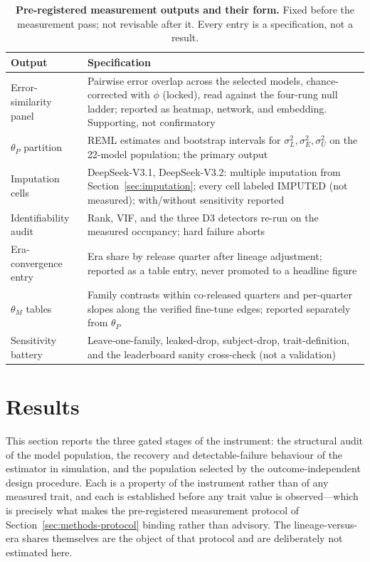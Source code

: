 \documentclass{ieeeaccess}
\theoremstyle{definition}
\theoremstyle{plain}
\begin{document}
\begin{table}[t]
\caption{\textbf{Pre-registered measurement outputs and their form.} Fixed
before the measurement pass; not revisable after it. Every entry is a
specification, not a result.}
\label{tab:prereg}
\setlength{\tabcolsep}{3pt}
\footnotesize
\begin{tabular}{|p{62pt}|p{164pt}|}
\hline
Output & Specification \\
\hline
Error-similarity panel & Pairwise error overlap across the selected models,
chance-corrected with $\phi$ (locked), read against the four-rung null ladder;
reported as heatmap, network, and embedding. Supporting, not confirmatory \\
$\theta_{P}$ partition & REML estimates and bootstrap intervals for
$\sigma^{2}_{L},\sigma^{2}_{E},\sigma^{2}_{U}$ on the 22-model population;
the primary output \\
Imputation cells & DeepSeek-V3.1, DeepSeek-V3.2: multiple imputation from
Section~\ref{sec:imputation}; every cell labeled IMPUTED (not measured);
with/without sensitivity reported \\
Identifiability audit & Rank, VIF, and the three D3 detectors re-run on the
measured occupancy; hard failure aborts \\
Era-convergence entry & Era share by release quarter after lineage adjustment;
reported as a table entry, never promoted to a headline figure \\
$\theta_{M}$ tables & Family contrasts within co-released quarters and
per-quarter slopes along the verified fine-tune edges; reported separately from
$\theta_{P}$ \\
Sensitivity battery & Leave-one-family, leaked-drop, subject-drop,
trait-definition, and the leaderboard sanity cross-check (not a validation) \\
\hline
\end{tabular}
\end{table}

\section{Results}
\label{sec:results}
This section reports the three gated stages of the instrument: the structural
audit of the model population, the recovery and detectable-failure behaviour of
the estimator in simulation, and the population selected by the
outcome-independent design procedure. Each is a property of the instrument
rather than of any measured trait, and each is established before any trait
value is observed---which is precisely what makes the pre-registered
measurement protocol of Section~\ref{sec:methods-protocol} binding rather than
advisory. The lineage-versus-era shares themselves are the object of that
protocol and are deliberately not estimated here.
\end{document}
